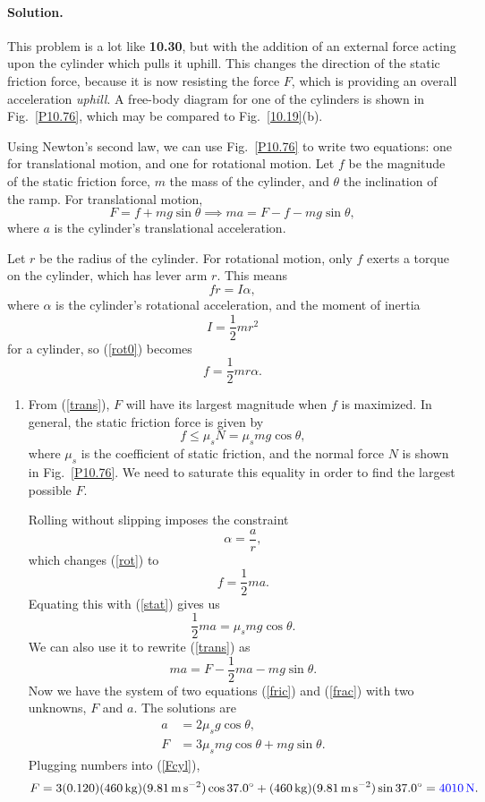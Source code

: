 \documentclass[11pt]{article}
\newcommand{\refeq}[1]{(\ref{#1})}
\newcommand{\beq}{\begin{equation*}}
\newcommand{\eeq}{\end{equation*}}
\newcommand{\beqn}{\begin{equation}}
\newcommand{\eeqn}{\end{equation}}
\newenvironment{solution}
{
    \paragraph{Solution.}
    \ignorespaces
}
{
    \bigskip
}
\begin{document}
\begin{solution}
	This problem is a lot like \textbf{10.30}, but with the addition of an external force acting upon the cylinder which pulls it uphill.  This changes the direction of the static friction force, because it is now resisting the force $F$, which is providing an overall acceleration \emph{uphill}.  A free-body diagram for one of the cylinders is shown in Fig.~\ref{P10.76}, which may be compared to Fig.~\ref{10.19}(b).
	
	Using Newton's second law, we can use Fig.~\ref{P10.76} to write two equations: one for translational motion, and one for rotational motion.  Let $f$ be the magnitude of the static friction force, $m$ the mass of the cylinder, and $\theta$ the inclination of the ramp.  For translational motion,
	\beqn \label{trans}
		F = f + m g \sin{\theta} \implies ma = F - f - m g \sin{\theta},
	\eeqn
	where $a$ is the cylinder's translational acceleration.
	
	Let $r$ be the radius of the cylinder.  For rotational motion, only $f$ exerts a torque on the cylinder, which has lever arm $r$.  This means
	\beqn \label{rot0}
		f r = I \alpha,
	\eeqn
	where $\alpha$ is the cylinder's rotational acceleration, and the moment of inertia
	\beq
		I = \frac{1}{2} m r^2
	\eeq
	for a cylinder, so \refeq{rot0} becomes
	\beqn \label{rot}
		f = \frac{1}{2} m r \alpha.
	\eeqn
	
	\begin{enumerate}
		\item From \refeq{trans}, $F$ will have its largest magnitude when $f$ is maximized.  In general, the static friction force is given by
			\beqn \label{stat}
				f \leq \mu_s N = \mu_s m g \cos \theta,
			\eeqn
			where $\mu_s$ is the coefficient of static friction, and the normal force $N$ is shown in Fig.~\ref{P10.76}.  We need to saturate this equality in order to find the largest possible $F$.
		
		Rolling without slipping imposes the constraint
			\beq
				\alpha = \frac{a}{r},
			\eeq
			which changes \refeq{rot} to
			\beq
				f = \frac{1}{2} m a.
			\eeq
			Equating this with \refeq{stat} gives us
			\beqn \label{fric}
				\frac{1}{2} m a = \mu_s m g \cos \theta.
			\eeqn
			We can also use it to rewrite \refeq{trans} as
			\beqn \label{frac}
				ma = F - \frac{1}{2} m a - m g \sin{\theta}.
			\eeqn
			Now we have the system of two equations \refeq{fric} and \refeq{frac} with two unknowns, $F$ and $a$.  The solutions are
			\begin{align}
				a &= 2 \mu_s g \cos{\theta}, \label{acyl} \\
				F &= 3 \mu_s m g \cos{\theta} + m g \sin{\theta}. \label{Fcyl}
			\end{align}
			Plugging numbers into \refeq{Fcyl},
			\beq
				F = 3 (0.120) (\SI{460}{\kg}) (\sig) \cos{37.0^\circ} + (\SI{460}{\kg}) (\sig) \sin{37.0^\circ} = {\color{blue} \SI{4010}{\newton}}.
			\eeq
			

\end{enumerate}
\end{solution}
\end{document}
